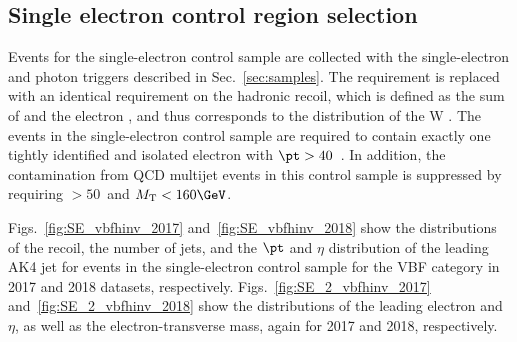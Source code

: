 {\newpage

\subsection{Single electron control region selection}
\label{sec:selection_cr_1e}
Events for the single-electron control sample are collected with the single-electron and photon triggers described in Sec.~\ref{sec:samples}.  
The \ptmiss requirement is replaced with an identical requirement on the hadronic recoil, which is defined as the sum of \ptvecmiss 
and the electron \vpt, and thus corresponds to the distribution of the W \pt.
The events in the single-electron control sample are required to contain exactly one tightly identified and isolated electron 
with $\pt > 40$~\GeV.
In addition, the contamination from QCD multijet events in this control sample is suppressed by requiring \MET$ > 50$~\GeV and $\mt < 160 \GeV$.

Figs.~\ref{fig:SE_vbfhinv_2017} and~\ref{fig:SE_vbfhinv_2018} show the distributions of the recoil, the number of jets, 
and the $\pt$ and $\eta$ distribution of the leading AK4 jet for events in the single-electron control sample for the VBF category 
in 2017 and 2018 datasets, respectively. 
Figs.~\ref{fig:SE_2_vbfhinv_2017} and~\ref{fig:SE_2_vbfhinv_2018} show the distributions of the leading electron \pt and $\eta$, 
as well as the electron-\ptmiss transverse mass, again for 2017 and 2018, respectively.

}
